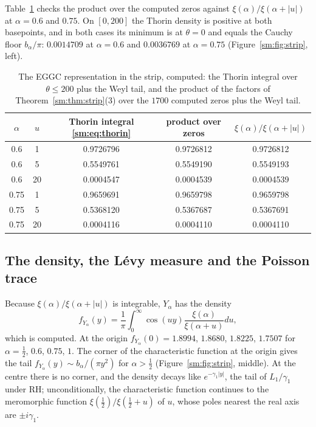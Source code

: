 Table~\ref{sm:tab:strip} checks the product over the computed zeros against $\xi(\alpha)/\xi(\alpha+|u|)$ at $\alpha=0.6$ and $0.75$. On $[0,200]$ the Thorin density is positive at both basepoints, and in both cases its minimum is at $\theta=0$ and equals the Cauchy floor $b_\alpha/\pi$: $0.0014709$ at $\alpha=0.6$ and $0.0036769$ at $\alpha=0.75$ (Figure~\ref{sm:fig:strip}, left).

\begin{table}[htbp]
\centering\small
\begin{tabular}{ccccc}
\toprule
$\alpha$ & $u$ & Thorin integral \eqref{sm:eq:thorin} & product over zeros & $\xi(\alpha)/\xi(\alpha+|u|)$\\
\midrule
0.6 & 1 & 0.9726796 & 0.9726812 & 0.9726812\\
0.6 & 5 & 0.5549761 & 0.5549190 & 0.5549193\\
0.6 & 20 & 0.0004547 & 0.0004539 & 0.0004539\\
0.75 & 1 & 0.9659691 & 0.9659798 & 0.9659798\\
0.75 & 5 & 0.5368120 & 0.5367687 & 0.5367691\\
0.75 & 20 & 0.0004116 & 0.0004110 & 0.0004110\\
\bottomrule
\end{tabular}
\caption{The EGGC representation in the strip, computed: the Thorin integral over $\theta\le200$ plus the Weyl tail, and the product of the factors of Theorem~\ref{sm:thm:strip}(3) over the $1700$ computed zeros plus the Weyl tail.}
\label{sm:tab:strip}
\end{table}

\subsection{The density, the L\'evy measure and the Poisson trace}\label{sm:sec:poisson}

Because $\xi(\alpha)/\xi(\alpha+|u|)$ is integrable, $Y_\alpha$ has the density
\[
f_{Y_\alpha}(y)=\frac1\pi\int_0^\infty\cos(uy)\frac{\xi(\alpha)}{\xi(\alpha+u)}du,
\]
which is computed. At the origin $f_{Y_\alpha}(0)=1.8994$, $1.8680$, $1.8225$, $1.7507$ for $\alpha=\frac12$, $0.6$, $0.75$, $1$. The corner of the characteristic function at the origin gives the tail $f_{Y_\alpha}(y)\sim b_\alpha/(\pi y^2)$ for $\alpha>\frac12$ (Figure~\ref{sm:fig:strip}, middle). At the centre there is no corner, and the density decays like $e^{-\gamma_1|y|}$, the tail of $L_1/\gamma_1$ under RH; unconditionally, the characteristic function continues to the meromorphic function $\xi(\frac12)/\xi(\frac12+u)$ of $u$, whose poles nearest the real axis are $\pm i\gamma_1$.

